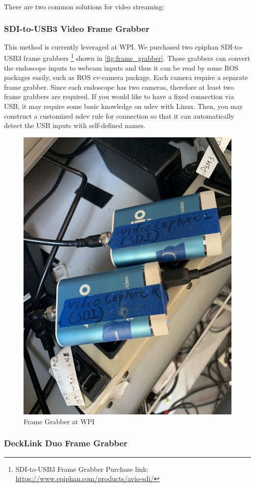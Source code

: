 There are two common solutions for video streaming:

\subsubsection{SDI-to-USB3 Video Frame Grabber}

This method is currently leveraged at WPI. We purchased two epiphan SDI-to-USB3 frame grabbers \footnote[3]{SDI-to-USB3 Frame Grabber Purchase link: \url{https://www.epiphan.com/products/avio-sdi/}} shown in \autoref{fig:frame_grabber}. Those grabbers can convert the endoscope inputs to webcam inputs and thus it can be read by some ROS packages easily, such as ROS cv-camera package. Each camera require a separate frame grabber. Since each endoscope has two cameras, therefore at least two frame grabbers are required. If you would like to have a fixed connection via USB, it may require some basic knowledge on udev with Linux. Then, you may construct a customized udev rule for connection so that it can automatically detect the USB inputs with self-defined names. 

\begin{figure}[H]
    \centering 
    \includegraphics[width=0.6\linewidth]{figures/frame_grabber.png}
    \caption{Frame Grabber at WPI}
    \label{fig:frame_grabber}
\end{figure}

\subsubsection{DeckLink Duo Frame Grabber}

